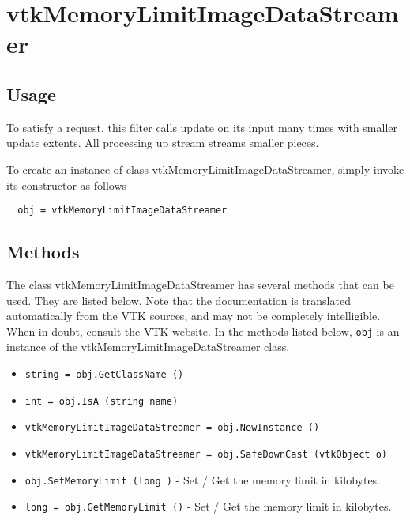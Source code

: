 \section{vtkMemoryLimitImageDataStreamer}

\subsection{Usage}

 To satisfy a request, this filter calls update on its input
 many times with smaller update extents.  All processing up stream
 streams smaller pieces.

To create an instance of class vtkMemoryLimitImageDataStreamer, simply
invoke its constructor as follows
\begin{verbatim}
  obj = vtkMemoryLimitImageDataStreamer
\end{verbatim}
\subsection{Methods}

The class vtkMemoryLimitImageDataStreamer has several methods that can be used.
  They are listed below.
Note that the documentation is translated automatically from the VTK sources,
and may not be completely intelligible.  When in doubt, consult the VTK website.
In the methods listed below, \verb|obj| is an instance of the vtkMemoryLimitImageDataStreamer class.
\begin{itemize}
\item  \verb|string = obj.GetClassName ()|

\item  \verb|int = obj.IsA (string name)|

\item  \verb|vtkMemoryLimitImageDataStreamer = obj.NewInstance ()|

\item  \verb|vtkMemoryLimitImageDataStreamer = obj.SafeDownCast (vtkObject o)|

\item  \verb|obj.SetMemoryLimit (long )| -  Set / Get the memory limit in kilobytes.

\item  \verb|long = obj.GetMemoryLimit ()| -  Set / Get the memory limit in kilobytes.

\end{itemize}

